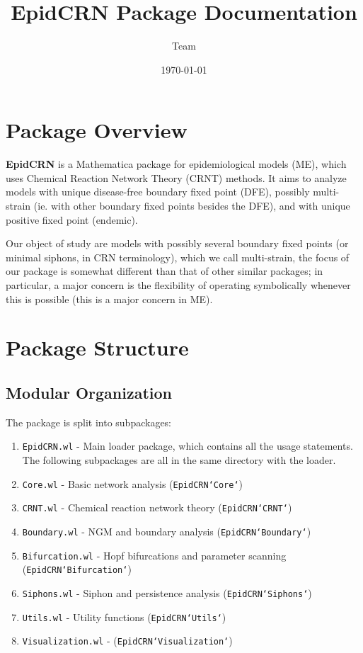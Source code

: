 \documentclass{article}
\title{EpidCRN Package  Documentation}
\author{Team}
\date{\today}
\begin{document}
\maketitle
\tableofcontents

\section{Package Overview}

\textbf{EpidCRN} is a Mathematica package for epidemiological models (ME), which uses Chemical Reaction Network Theory (CRNT) methods. It aims to analyze models with unique disease-free boundary fixed point (DFE), possibly multi-strain (ie. with other boundary fixed points besides the DFE), and with unique positive fixed point (endemic).

Our object of study are models with possibly several boundary fixed points (or minimal siphons, in CRN terminology), which we call multi-strain, the focus of our package is somewhat different than that of other similar packages; in particular, a major concern is the flexibility of operating symbolically whenever this is possible (this is a major concern in ME).

\section{Package Structure}

\subsection{Modular Organization}
The package is split into subpackages:

\begin{enumerate}
\item \texttt{EpidCRN.wl} - Main loader package, which contains all the usage statements. The following subpackages are all in the same directory with the loader.
\item \texttt{Core.wl} - Basic network analysis (\texttt{EpidCRN`Core`})
\item \texttt{CRNT.wl} - Chemical reaction network theory (\texttt{EpidCRN`CRNT`})
\item \texttt{Boundary.wl} - NGM and boundary analysis (\texttt{EpidCRN`Boundary`})
\item \texttt{Bifurcation.wl} - Hopf bifurcations and parameter scanning (\texttt{EpidCRN`Bifurcation`})
\item \texttt{Siphons.wl} - Siphon and persistence analysis (\texttt{EpidCRN`Siphons`})
\item \texttt{Utils.wl} - Utility functions (\texttt{EpidCRN`Utils`})
\item \texttt{Visualization.wl} - (\texttt{EpidCRN`Visualization`})
\end{enumerate}
\end{document}

